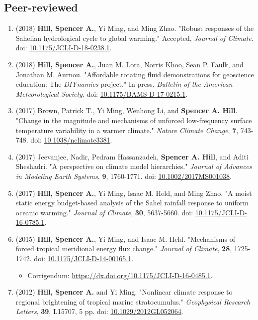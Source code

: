 \documentclass[12pt,letterpaper]{shillcv}
\begin{document}
\subsection*{Peer-reviewed}
\label{sec:orgc2a16c6}
\begin{enumerate}
\item (2018) \textbf{Hill, Spencer A.}, Yi Ming, and Ming Zhao.  "Robust responses of the
Sahelian hydrological cycle to global warming."  Accepted, \emph{Journal of
Climate}.  doi: \href{https://doi.org/10.1175/JCLI-D-18-0238.1}{10.1175/JCLI-D-18-0238.1}.
\item (2018) \textbf{Hill, Spencer A.}, Juan M. Lora, Norris Khoo, Sean P. Faulk, and
Jonathan M.  Aurnou.  "Affordable rotating fluid demonstrations for
geoscience education: The \emph{DIYnamics} project."  In press, \emph{Bulletin of the
American Meteorological Society}.  doi: \href{https://doi.org/10.1175/BAMS-D-17-0215.1}{10.1175/BAMS-D-17-0215.1}.
\item (2017) Brown, Patrick T., Yi Ming, Wenhong Li, and \textbf{Spencer A. Hill}.  "Change
in the magnitude and mechanisms of unforced low-frequency surface temperature
variability in a warmer climate."  \emph{Nature Climate Change}, \textbf{7}, 743-748.
doi: \href{https://doi.org/10.1038/nclimate3381}{10.1038/nclimate3381}.
\item (2017) Jeevanjee, Nadir, Pedram Hassanzadeh, \textbf{Spencer A. Hill}, and Aditi
Sheshadri.  "A perspective on climate model hierarchies."  \emph{Journal
of Advances in Modeling Earth Systems}, \textbf{9}, 1760-1771.  doi: \href{https://doi.org/10.1002/2017MS001038}{10.1002/2017MS001038}.
\item (2017) \textbf{Hill, Spencer A.}, Yi Ming, Isaac M. Held, and Ming Zhao.  "A moist
static energy budget-based analysis of the Sahel rainfall response to uniform
oceanic warming."  \emph{Journal of Climate}, \textbf{30}, 5637-5660.  doi:
\href{https://doi.org/10.1175/JCLI-D-16-0785.1}{10.1175/JCLI-D-16-0785.1}.
\item (2015) \textbf{Hill, Spencer A.}, Yi Ming, and Isaac M. Held.  "Mechanisms of forced
tropical meridional energy flux change."  \emph{Journal of Climate}, \textbf{28}, 1725-1742.
doi: \href{http://dx.doi.org/10.1175/JCLI-D-14-00165.1}{10.1175/JCLI-D-14-00165.1}.
\begin{itemize}
\item Corrigendum: \url{https://dx.doi.org/10.1175/JCLI-D-16-0485.1}.
\end{itemize}
\item (2012) \textbf{Hill, Spencer A.} and Yi Ming.  "Nonlinear climate response to regional
brightening of tropical marine stratocumulus."  \emph{Geophysical Research Letters},
\textbf{39}, L15707, 5 pp. doi:
\href{http://dx.doi.org/10.1029/2012GL052064}{10.1029/2012GL052064}.
\end{enumerate}
\end{document}
